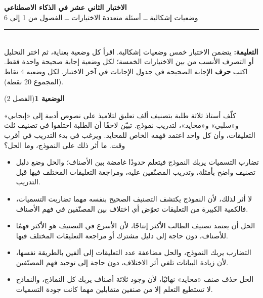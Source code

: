 \documentclass[11pt,a4paper]{article}
\begin{document}
\linespread{1.08}\selectfont
\begin{center}
{\LARGE\khatt\textbf{الاختبار الثاني عشر في الذكاء الاصطناعي}}\\[4pt]
{\normalsize وضعيات إشكالية ــ أسئلة متعددة الاختيارات ــ الفصول من 1 إلى 6}
\end{center}
\vspace{-2pt}\rule{\textwidth}{0.6pt}\\[2pt]
\textbf{التعليمة:} يتضمن الاختبار خمس وضعيات إشكالية. اقرأ كل وضعية بعناية، ثم اختر التحليل أو التصرف الأنسب
من بين الاختيارات الخمسة؛ لكل وضعية إجابة صحيحة واحدة فقط.
اكتب \textbf{حرف} الإجابة الصحيحة في جدول الإجابات في آخر الاختبار.
لكل وضعية 4 نقاط (المجموع 20 نقطة).
\vspace{4pt}

\noindent
{\large\khatt\textbf{الوضعية 1}}\hfill{\small(الفصل 2)}\par\nopagebreak\vspace{3pt}
\setlength{\fboxsep}{7pt}\colorbox{gray!10}{\parbox{\dimexpr\linewidth-14pt}{كلّف أستاذ ثلاثة طلبة بتصنيف ألف تعليق لتلاميذ على نصوص أدبية إلى «إيجابي» و«سلبي» و«محايد»، لتدريب نموذج. تبيّن لاحقًا أن الطلبة اختلفوا في تصنيف ثلث التعليقات، وأن كل واحد اعتمد فهمه الخاص للمحايد. ويرغب في بدء التدريب في أقرب وقت. ما أثر ذلك على النموذج، وما الحل؟}}\par\nopagebreak
\begin{itemize}[leftmargin=1.0cm, labelsep=6pt, itemsep=3pt, topsep=4pt, parsep=0pt]
  \item[\textbf{أ)}] تضارب التسميات يربك النموذج فيتعلم حدودًا غامضة بين الأصناف؛ والحل وضع دليل تصنيف واضح بأمثلة، وتدريب المصنّفين عليه، ومراجعة التعليقات المختلف فيها قبل التدريب.
  \item[\textbf{ب)}] لا أثر لذلك، لأن النموذج يكتشف التصنيف الصحيح بنفسه مهما تضاربت التسميات، فالكمية الكبيرة من التعليقات تعوّض أي اختلاف بين المصنّفين في فهم الأصناف.
  \item[\textbf{ج)}] الحل أن يعتمد تصنيف الطالب الأكثر إنتاجًا، لأن الأسرع في التصنيف هو الأكثر فهمًا للأصناف، دون حاجة إلى دليل مشترك أو مراجعة التعليقات المختلف فيها.
  \item[\textbf{د)}] التضارب يربك النموذج، والحل مضاعفة عدد التعليقات إلى ألفين بالطريقة نفسها، لأن زيادة البيانات تلغي أثر الاختلاف، دون حاجة إلى توحيد فهم المصنّفين.
  \item[\textbf{هـ)}] الحل حذف صنف «محايد» نهائيًا، لأن وجود ثلاثة أصناف يربك كل النماذج، والنماذج لا تستطيع التعلم إلا من صنفين متقابلين مهما كانت جودة التسميات.
\end{itemize}
\end{document}
